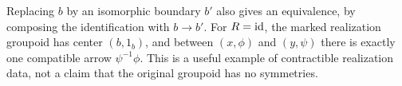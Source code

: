 Replacing \(b\) by an isomorphic boundary \(b'\) also gives an equivalence, by composing the identification with \(b\to b'\). For \(R=\operatorname{id}\), the marked realization groupoid has center \((b,1_b)\), and between \((x,\phi)\) and \((y,\psi)\) there is exactly one compatible arrow \(\psi^{-1}\phi\). This is a useful example of contractible realization data, not a claim that the original groupoid has no symmetries.

